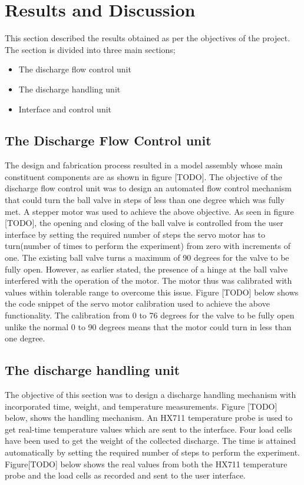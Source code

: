 \section{Results and Discussion}
\par
This section described the results obtained as per the objectives of the project. The section is divided into three main sections;
\begin{itemize}
    \item The discharge flow control unit
    \item The discharge handling unit
    \item Interface and control unit
\end{itemize}
\subsection{The Discharge Flow Control unit}
\par
The design and fabrication process resulted in a  model assembly whose main constituent components are as shown in figure [TODO]. The objective of the discharge flow control unit was to design an automated flow control mechanism that could turn the ball valve in steps of less than one degree which was fully met. A stepper motor was used to achieve the above objective. As seen in figure [TODO], the opening and closing of the ball valve is controlled from the user interface by setting the required number of steps the servo motor has to turn(number of times to perform the experiment) from zero with increments of one. The existing ball valve turns a maximum of 90 degrees for the valve to be fully open. However, as earlier stated, the presence of a hinge at the ball valve interfered with the operation of the motor. The motor thus was calibrated with values within tolerable range to overcome this issue. Figure [TODO] below shows the code snippet of the servo motor calibration used to achieve the above functionality. The calibration from 0 to 76 degrees for the valve to be fully open unlike the normal 0 to 90 degrees means that the motor could turn in less than one degree.
\subsection{The discharge handling unit}
\par
The objective of this section was to design a discharge handling mechanism with incorporated time, weight, and temperature measurements. Figure [TODO] below, shows the handling mechanism. An HX711 temperature probe is used to get real-time temperature values which are sent to the interface. Four load cells have been used to get the weight of the collected discharge. The time is attained automatically by setting the required number of steps to perform the experiment. Figure[TODO] below shows the real values from both the HX711 temperature probe and the load cells as recorded and sent to the user interface.
